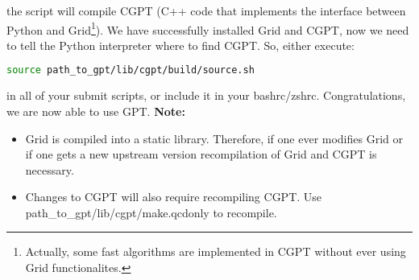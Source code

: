 \documentclass[a4paper,10pt]{scrartcl}
\begin{document}
the script will compile CGPT (C++ code that implements the interface between Python and Grid\footnote{Actually, some fast algorithms are implemented in CGPT
without ever using Grid functionalites.}). \newline
We have successfully installed Grid and CGPT, now we need to tell the Python interpreter where to find CGPT. So, either execute:
\begin{lstlisting}[language=bash]
    source path_to_gpt/lib/cgpt/build/source.sh
\end{lstlisting}
in all of your submit scripts, or include it in your bashrc/zshrc.
Congratulations, we are now able to use GPT.\newline
\textbf{Note:}
\begin{itemize}
    \item Grid is compiled into a static library. Therefore, if one ever modifies Grid or if one gets a new upstream version recompilation of
    Grid and CGPT is necessary.
    \item Changes to CGPT will also require recompiling CGPT. Use path\_to\_gpt/lib/cgpt/make.qcdonly to recompile.
\end{itemize}
\end{document}
